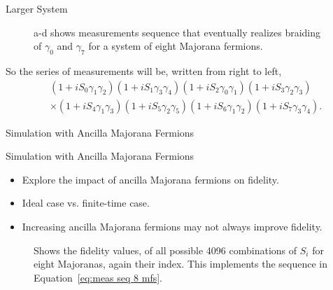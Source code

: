 \documentclass{loyola-beamer}
\begin{document}
\begin{frame}{Larger System}
	\begin{figure}
		\begin{center}
			
		\end{center}
		\caption{a-d shows measurements sequence that eventually realizes braiding of $ \gamma_0 $ and $ \gamma_7 $ for a system of eight Majorana fermions.}
		\label{fig:8-conf-meas}
	\end{figure}
\end{frame}

\begin{frame}
	So the series of measurements will be, written from right to left,
	\begin{equation}
		\begin{aligned}
			 & (1+ i S_0 \gamma_1 \gamma_2)(1+ i S_1 \gamma_3 \gamma_4)(1+ i S_2 \gamma_0 \gamma_1) (1+ i S_3 \gamma_2 \gamma_3)         \\
			 & \times (1+ i S_4 \gamma_1 \gamma_3)(1+ i S_5 \gamma_2 \gamma_5)(1+ i S_6 \gamma_1 \gamma_2)(1+ i S_7 \gamma_3 \gamma_4) .
		\end{aligned}
		\label{eq:meas seq 8 mfs}
	\end{equation}
\end{frame}

\begin{titleframe}{Simulation with Ancilla Majorana Fermions}
\end{titleframe}

\begin{frame}{Simulation with Ancilla Majorana Fermions}
	\begin{itemize}
		\item Explore the impact of ancilla Majorana fermions on fidelity.
		\item Ideal case vs. finite-time case.
		\item Increasing ancilla Majorana fermions may not always improve fidelity.
	\end{itemize}
\end{frame}

\begin{frame}
	\begin{figure}
		\begin{center}
			
		\end{center}
		\caption{Shows the fidelity values, of all possible 4096 combinations of $ S_i $ for eight Majoranas, again their index. This implements the sequence in Equation~\ref{eq:meas seq 8 mfs}.}
		\label{fig:ideal fids all combs}
	\end{figure}
\end{frame}
\end{document}

